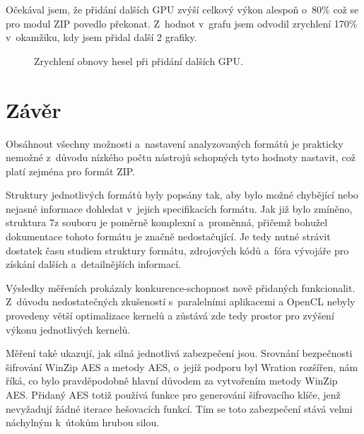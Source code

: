 Očekával jsem, že přidání dalších GPU zvýší celkový výkon alespoň o~80\% což se pro modul ZIP
povedlo překonat. Z~hodnot v~grafu jsem odvodil zrychlení 170\% v~okamžiku, kdy jsem přidal další
2 grafiky.

\begin{figure}[ht]
    \begin{center}
	\caption{Zrychlení obnovy hesel při přidání dalších GPU.}
	\label{memory}
    \end{center}
\end{figure}

\chapter{Závěr}
Obsáhnout všechny možnosti a~nastavení analyzovaných formátů je prakticky nemožné z~důvodu nízkého
počtu nástrojů schopných tyto hodnoty nastavit, což platí zejména pro formát ZIP.

 Struktury jednotlivých formátů byly popsány tak, aby bylo možné chybějící nebo nejasné informace
dohledat v~jejich specifikacích formátu. Jak již bylo zmíněno, struktura 7z souboru je poměrně
komplexní a~proměnná, přičemž bohužel dokumentace tohoto formátu je značně nedostačující. Je tedy
nutné strávit dostatek času studiem struktury formátu, zdrojových kódů a~fóra vývojáře pro získání dalších a~detailnějších informací.

 Výsledky měřeních prokázaly konkurence-schopnost nově přidaných funkcionalit. Z~důvodu
nedostatečných zkušeností s~paralelními aplikacemi a OpenCL nebyly provedeny větší
optimalizace kernelů a zůstává zde tedy prostor pro zvýšení výkonu jednotlivých kernelů. 

 Měření také ukazují, jak silná jednotlivá zabezpečení jsou. Srovnání bezpečnosti šifrování
WinZip AES a metody AES, o~jejíž podporu byl Wration rozšířen, nám říká, co bylo pravděpodobně hlavní
důvodem za vytvořením metody WinZip AES. Přidaný AES totiž používá funkce pro generování
šifrovacího klíče, jenž nevyžadují žádné iterace hešovacích funkcí. Tím se toto zabezpečení stává
velmi náchylným k~útokům hrubou silou.

